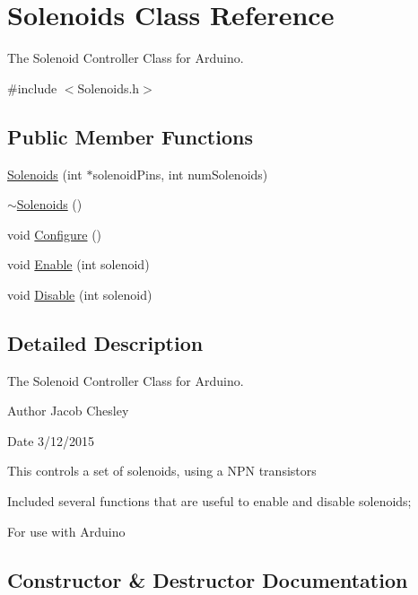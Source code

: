\hypertarget{class_solenoids}{}\section{Solenoids Class Reference}
\label{class_solenoids}


The Solenoid Controller Class for Arduino.  




{\ttfamily \#include $<$Solenoids.\+h$>$}

\subsection*{Public Member Functions}
\begin{DoxyCompactItemize}
\item 
\hyperlink{class_solenoids_ad00d5839842d0ef316d2cc247820281e}{Solenoids} (int $\ast$solenoid\+Pins, int num\+Solenoids)
\item 
\hyperlink{class_solenoids_a84e5c6c59afd9ba91253ac440cfac918}{$\sim$\+Solenoids} ()
\item 
void \hyperlink{class_solenoids_a85733a560fb7d763e08bd68c6a605b48}{Configure} ()
\item 
void \hyperlink{class_solenoids_adbc5b09c3ec7cb15cb1d802900c959e7}{Enable} (int solenoid)
\item 
void \hyperlink{class_solenoids_ae68283186a15f6e5a66fbf883eca2eda}{Disable} (int solenoid)
\end{DoxyCompactItemize}


\subsection{Detailed Description}
The Solenoid Controller Class for Arduino. 

\begin{DoxyAuthor}{Author}
Jacob Chesley 
\end{DoxyAuthor}
\begin{DoxyDate}{Date}
3/12/2015
\end{DoxyDate}
This controls a set of solenoids, using a N\+P\+N transistors

Included several functions that are useful to enable and disable solenoids;

For use with Arduino 

\subsection{Constructor \& Destructor Documentation}
\hypertarget{class_solenoids_ad00d5839842d0ef316d2cc247820281e}{}
